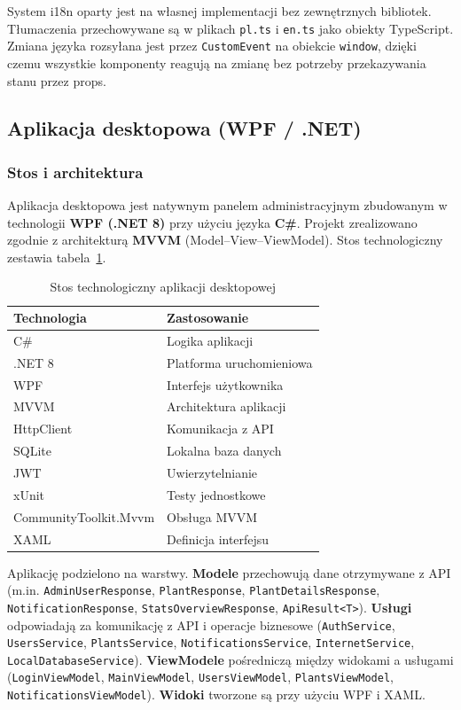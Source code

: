 \documentclass[12pt,a4paper]{article}
\begin{document}
System i18n oparty jest na w\l{}asnej implementacji bez zewn\k{e}trznych bibliotek. T\l{}umaczenia przechowywane s\k{a} w plikach \texttt{pl.ts} i \texttt{en.ts} jako obiekty TypeScript. Zmiana j\k{e}zyka rozsy\l{}ana jest przez \texttt{CustomEvent} na obiekcie \texttt{window}, dzi\k{e}ki czemu wszystkie komponenty reaguj\k{a} na zmian\k{e} bez potrzeby przekazywania stanu przez props.

\subsection{Aplikacja desktopowa (WPF / .NET)}

\subsubsection{Stos i architektura}

Aplikacja desktopowa jest natywnym panelem administracyjnym zbudowanym w technologii \textbf{WPF (.NET 8)} przy u\.zyciu j\k{e}zyka \textbf{C\#}. Projekt zrealizowano zgodnie z architektur\k{a} \textbf{MVVM} (Model--View--ViewModel). Stos technologiczny zestawia tabela~\ref{tab:stos_desktop}.

\begin{table}[htbp]
\centering
\caption{Stos technologiczny aplikacji desktopowej}
\label{tab:stos_desktop}
\vspace{0.3em}
\begin{tabular}{@{}ll@{}}
\toprule
\textbf{Technologia} & \textbf{Zastosowanie} \\
\midrule
C\# & Logika aplikacji \\
.NET 8 & Platforma uruchomieniowa \\
WPF & Interfejs u\.zytkownika \\
MVVM & Architektura aplikacji \\
HttpClient & Komunikacja z API \\
SQLite & Lokalna baza danych \\
JWT & Uwierzytelnianie \\
xUnit & Testy jednostkowe \\
CommunityToolkit.Mvvm & Obs\l{}uga MVVM \\
XAML & Definicja interfejsu \\
\bottomrule
\end{tabular}
\end{table}

Aplikacj\k{e} podzielono na warstwy. \textbf{Modele} przechowuj\k{a} dane otrzymywane z API (m.in. \texttt{AdminUserResponse}, \texttt{PlantResponse}, \texttt{PlantDetailsResponse}, \texttt{NotificationResponse}, \texttt{StatsOverviewResponse}, \texttt{ApiResult<T>}). \textbf{Us\l{}ugi} odpowiadaj\k{a} za komunikacj\k{e} z API i operacje biznesowe (\texttt{AuthService}, \texttt{UsersService}, \texttt{PlantsService}, \texttt{NotificationsService}, \texttt{InternetService}, \texttt{LocalDatabaseService}). \textbf{ViewModele} po\'srednicz\k{a} mi\k{e}dzy widokami a us\l{}ugami (\texttt{LoginViewModel}, \texttt{MainViewModel}, \texttt{UsersViewModel}, \texttt{PlantsViewModel}, \texttt{NotificationsViewModel}). \textbf{Widoki} tworzone s\k{a} przy u\.zyciu WPF i XAML.
\end{document}
